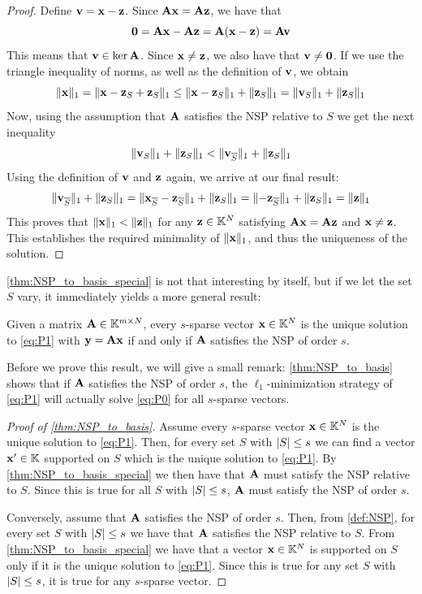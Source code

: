 \begin{proof}
	Define $ \mathbf{v} = \mathbf{x} - \mathbf{z} $. Since $ \mathbf{A}\mathbf{x} = \mathbf{A}\mathbf{z} $, we have that 
	\[
		\mathbf{0} = \mathbf{A}\mathbf{x} - \mathbf{A}\mathbf{z} = \mathbf{A}(\mathbf{x} -\mathbf{z}) = \mathbf{A}\mathbf{v}
	\]
	This means that $ \mathbf{v} \in \ker\mathbf{A} $. Since $ \mathbf{x}\neq\mathbf{z} $, we also have that $ \mathbf{v}\neq \mathbf{0} $. If we use the triangle inequality of norms, as well as the definition of $ \mathbf{v} $, we obtain
	\[
	      \lVert\mathbf{x}\rVert_{1} 
		= \lVert\mathbf{x} - \mathbf{z}_{S} + \mathbf{z}_{S}\rVert_{1}
		  \leq \lVert\mathbf{x} - \mathbf{z}_{S}\rVert_{1} + \lVert\mathbf{z}_{S}\rVert_{1}
		= \lVert\mathbf{v}_{S}\rVert_{1} + \lVert\mathbf{z}_{S}\rVert_{1}
	\]
	Now, using the assumption that $ \mathbf{A} $ satisfies the NSP relative to $ S $ we get the next inequality
	\[
		\lVert\mathbf{v}_{S}\rVert_{1} + \lVert\mathbf{z}_{S}\rVert_{1} < \lVert\mathbf{v}_{\overline{S}}\rVert_{1} + \lVert\mathbf{z}_{S}\rVert_{1}
	\]
	Using the definition of $ \mathbf{v} $ and $ \mathbf{z} $ again, we arrive at our final result:
	\[ 
		  \lVert\mathbf{v}_{\overline{S}}\rVert_{1} + \lVert\mathbf{z}_{S}\rVert_{1}
		= \lVert\mathbf{x}_{\overline{S}} - \mathbf{z}_{\overline{S}}\rVert_{1} + \lVert\mathbf{z}_{S}\rVert_{1}
		= \lVert- \mathbf{z}_{\overline{S}}\rVert_{1} + \lVert\mathbf{z}_{S}\rVert_{1}
		= \lVert\mathbf{z}\rVert_{1}
	\]
	This proves that $ \lVert\mathbf{x}\rVert_{1} < \lVert\mathbf{z}\rVert_{1} $ for any $ \mathbf{z} \in \mathbb{K}^{N} $ satisfying $ \mathbf{A}\mathbf{x} = \mathbf{A}\mathbf{z} $ and $ \mathbf{x} \neq \mathbf{z} $. This establishes the required minimality of $ \lVert\mathbf{x}\rVert_{1} $, and thus the uniqueness of the solution.
\end{proof}

\cref{thm:NSP_to_basis_special} is not that interesting by itself, but if we let the set $ S $ vary, it immediately yields a more general result:

\begin{corollary}
	\label{thm:NSP_to_basis}
	Given a matrix $ \mathbf{A} \in \mathbb{K}^{m \times N} $, every $ s $-sparse vector $ \mathbf{x} \in \mathbb{K}^{N} $ is the unique solution to \eqref{eq:P1} with $ \mathbf{y} = \mathbf{A}\mathbf{x} $ if and only if $ \mathbf{A} $ satisfies the NSP of order $ s $. 
\end{corollary}

Before we prove this result, we will give a small remark: \cref{thm:NSP_to_basis} shows that if $ \mathbf{A} $ satisfies the NSP of order $ s $, the $ \ell_{1} $-minimization strategy of \eqref{eq:P1} will actually solve \eqref{eq:P0} for all $ s $-sparse vectors.

\begin{proof}[Proof of \cref{thm:NSP_to_basis}]
	Assume every $ s $-sparse vector $ \mathbf{x}\in\mathbb{K}^{N} $ is the unique solution to \eqref{eq:P1}. Then, for every set $ S $ with $ \left|S\right| \leq s $ we can find a vector $ \mathbf{x}'\in\mathbb{K} $ supported on $ S $ which is the unique solution to \eqref{eq:P1}. By \cref{thm:NSP_to_basis_special} we then have that $ \mathbf{A} $ must satisfy the NSP relative to $ S $. Since this is true for all $ S $ with $ \left|S\right| \leq s $, $ \mathbf{A} $ must satisfy the NSP of order $ s $.
	
	Conversely, assume that $ \mathbf{A} $ satisfies the NSP of order $ s $. Then, from \cref{def:NSP}, for every set $ S $ with $ \left|S\right| \leq s $ we have that $ \mathbf{A} $ satisfies the NSP relative to $ S $. From \cref{thm:NSP_to_basis_special} we have that a vector $ \mathbf{x}\in\mathbb{K}^{N} $ is supported on $ S $ only if it is the unique solution to \eqref{eq:P1}. Since this is true for any set $ S $ with $ \left|S\right| \leq s $, it is true for any $ s $-sparse vector.
\end{proof} 









